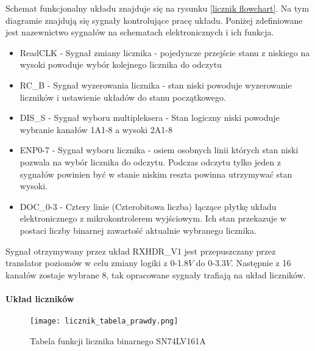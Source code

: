 Schemat funkcjonalny układu znajduje się na rysunku \ref{licznik flowchart}.
Na tym diagramie znajdują się sygnały kontrolujące pracę układu. Poniżej zdefiniowane jest nazewnictwo sygnałów na schematach elektronicznych i ich funkcja.  
\begin{itemize}
        \item ReadCLK - Sygnał zmiany licznika - pojedyncze przejście stanu z niskiego na wysoki powoduje wybór kolejnego licznika do odczytu
        \item RC\_B - Sygnał wyzerowania licznika - stan niski powoduje wyzerowanie liczników i ustawienie układów do stanu początkowego.
        \item DIS\_S - Sygnał wyboru multipleksera - Stan logiczny niski powoduje wybranie kanałów 1A1-8 a wysoki 2A1-8
        \item ENP0-7 - Sygnał wyboru licznika - osiem osobnych linii których stan niski pozwala na wybór licznika do odczytu. Podczas odczytu tylko jeden z sygnałów powinien być w stanie niskim reszta powinna utrzymywać stan wysoki. 
        \item DOC\_0-3 - Cztery linie (Czterobitowa liczba) łączące płytkę układu elektronicznego z mikrokontrolerem wyjściowym. Ich stan przekazuje w postaci liczby binarnej zawartość aktualnie wybranego licznika.  
\end{itemize}
Sygnał otrzymywany przez układ RXHDR\_V1 jest przepuszczany przez translator poziomów w celu zmiany logiki z 0-1.8$V$ do 0-3.3$V$. Następnie z 16 kanałów zostaje wybrane 8, tak opracowane sygnały trafiają na układ liczników.

\paragraph{Układ liczników \cite{licznik doc}\cite{slave}}

\begin{figure}[]
        \centering
        \texttt{[image: licznik\_tabela\_prawdy.png]}
        \caption{Tabela funkcji licznika binarnego SN74LV161A \cite{licznik doc}}
        \label{licznik tabela funkcji}
\end{figure}

